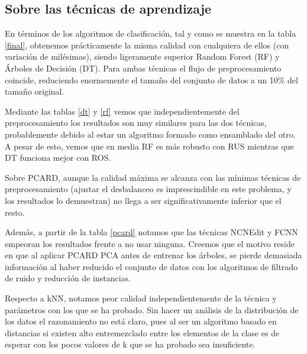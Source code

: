 \subsection{Sobre las técnicas de aprendizaje}

En términos de los algoritmos de clasificación, tal y como se muestra en la tabla \ref{final}, obtenemos prácticamente la misma calidad con cualquiera de ellos (con variación de milésimas), siendo ligeramente superior Random Forest (RF) y Árboles de Decisión (DT). Para ambas técnicas el flujo de preprocesamiento coincide, reduciendo enormemente el tamaño del conjunto de datos a un 10\% del tamaño original.

Mediante las tablas \ref{dt} y \ref{rf} vemos que independientemente del preprocesamiento los resultados son muy similares para las dos técnicas, probablemente debido al estar un algoritmo formado como ensamblado del otro. A pesar de esto, vemos que en media RF es más robusto con RUS mientras que DT funciona mejor con ROS.

\vspace{\baselineskip}

Sobre PCARD, aunque la calidad máxima se alcanza con las mínimas técnicas de preprocesamiento (ajustar el desbalanceo es imprescindible en este problema, y los resultados lo demuestran) no llega a ser significativamente inferior que el resto. 

Además, a partir de la tabla \ref{pcard} notamos que las técnicas NCNEdit y FCNN empeoran los resultados frente a no usar ninguna. Creemos que el motivo reside en que al aplicar PCARD PCA antes de entrenar los árboles, se pierde demasiada información al haber reducido el conjunto de datos con los algoritmos de filtrado de ruido y reducción de instancias.

\vspace{\baselineskip}

Respecto a kNN, notamos peor calidad independientemente de la técnica y parámetros con los que se ha probado. Sin hacer un análisis de la distribución de los datos el razonamiento no está claro, pues al ser un algoritmo basado en distancias si existen alto entremezclado entre los elementos de la clase es de esperar con los pocos valores de k que se ha probado sea insuficiente.


